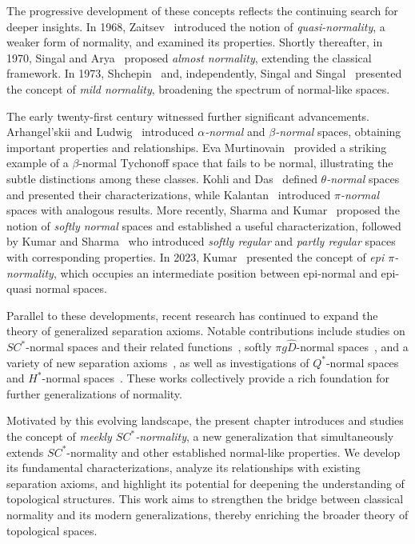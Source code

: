 \documentclass[12pt,a4paper,twoside]{report}  %
\theoremstyle{plain}
\theoremstyle{definition}
\begin{document}
The progressive development of these concepts reflects the continuing search 
for deeper insights. In 1968, Zaitsev~\cite{zaitsev1968certain} introduced the notion of 
\emph{quasi-normality}, a weaker form of normality, and examined its properties. 
Shortly thereafter, in 1970, Singal and Arya~\cite{singal1969almost} proposed 
\emph{almost normality}, extending the classical framework. 
In 1973, Shchepin~\cite{schepin1972real} and, independently, Singal and 
Singal~\cite{singal1973mildly} presented the concept of \emph{mild normality}, 
broadening the spectrum of normal-like spaces.

The early twenty-first century witnessed further significant advancements. 
Arhangel’skii and Ludwig~\cite{bourbaki1951topologie} introduced 
\emph{$\alpha$-normal} and \emph{$\beta$-normal} spaces, obtaining 
important properties and relationships. Eva Murtinovain~\cite{murtinova2002beta} 
provided a striking example of a $\beta$-normal Tychonoff space that fails 
to be normal, illustrating the subtle distinctions among these classes. 
Kohli and Das~\cite{kohli2002new} defined \emph{$\theta$-normal} spaces and 
presented their characterizations, while Kalantan~\cite{kalantan2008pinormal} 
introduced \emph{$\pi$-normal} spaces with analogous results. 
More recently, Sharma and Kumar~\cite{sharma2015softly} proposed the 
notion of \emph{softly normal} spaces and established a useful characterization, 
followed by Kumar and Sharma~\cite{kumar2018softly} who introduced 
\emph{softly regular} and \emph{partly regular} spaces with corresponding 
properties. In 2023, Kumar~\cite{kumar2023epi} presented the concept of 
\emph{epi $\pi$-normality}, which occupies an intermediate position 
between epi-normal and epi-quasi normal spaces.

Parallel to these developments, recent research has continued to expand the 
theory of generalized separation axioms. Notable contributions include 
studies on $SC^*$-normal spaces and their related functions~\cite{tomar2025sc}, 
softly $\pi g\widehat{D}$-normal spaces~\cite{tomar2025softly}, 
and a variety of new separation axioms~\cite{tomar2025some}, 
as well as investigations of $Q^*$-normal spaces~\cite{kumar2025q} 
and $H^*$-normal spaces~\cite{tomar2025h}. 
These works collectively provide a rich foundation for further 
generalizations of normality.

Motivated by this evolving landscape, the present chapter introduces and 
studies the concept of \emph{meekly $SC^*$-normality}, 
a new generalization that simultaneously extends $SC^*$-normality and 
other established normal-like properties. We develop its fundamental 
characterizations, analyze its relationships with existing separation axioms, 
and highlight its potential for deepening the understanding of topological 
structures. This work aims to strengthen the bridge between classical 
normality and its modern generalizations, thereby enriching the broader 
theory of topological spaces.
\end{document}
